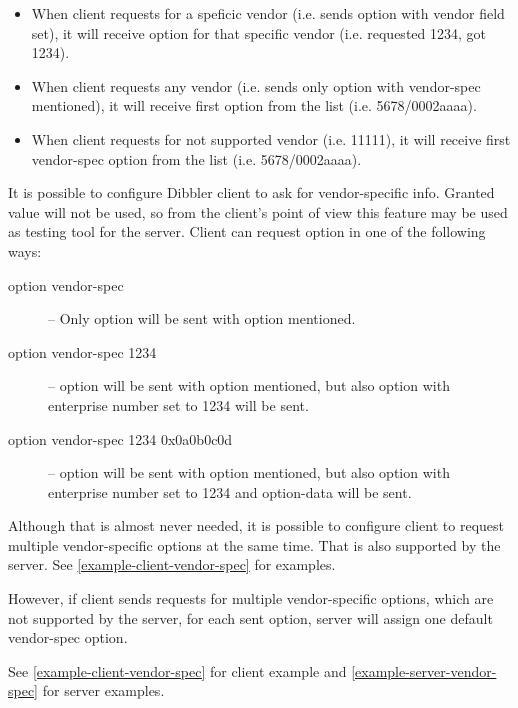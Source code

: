 \begin{enumerate}
\begin{itemize}
\item When client requests for a speficic vendor (i.e. sends
   option with vendor field set), it will
  receive option for that specific vendor (i.e. requested 1234, got
  1234).
 \item When client requests any vendor (i.e. sends only  option with vendor-spec mentioned), it will receive first
    option from the list (i.e. 5678/0002aaaa).
 \item When client requests for not supported vendor (i.e. 11111), it
   will receive first vendor-spec option from the list
   (i.e. 5678/0002aaaa).
\end{itemize}

It is possible to configure Dibbler client to ask for vendor-specific
info. Granted value will not be used, so from the client's point of
view this feature may be used as testing tool for the server. Client
can request  option in one of the
following ways:

\begin{description}
\item[option vendor-spec] -- Only  option will be
  sent with  option mentioned.
\item[option vendor-spec 1234] --  option will be
  sent with  option mentioned, but also
   option with enterprise number set to 1234
  will be sent.
\item[option vendor-spec 1234 0x0a0b0c0d] -- 
  option will be sent with  option mentioned,
  but also  option with enterprise number set to
  1234 and option-data will be sent.
\end{description}

Although that is almost never needed, it is possible to configure
client to request multiple vendor-specific options at the same
time. That is also supported by the server. See
\ref{example-client-vendor-spec} for examples.


However, if client sends requests for multiple vendor-specific
options, which are not supported by the server, for each sent option,
server will assign one default vendor-spec option.

See \ref{example-client-vendor-spec} for client example and
\ref{example-server-vendor-spec} for server examples.


\end{enumerate}
